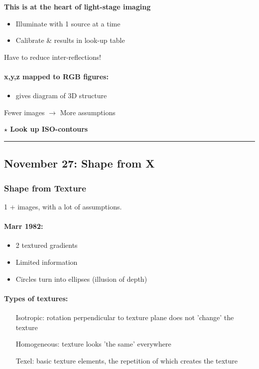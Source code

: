 \documentclass[paper=a4, fontsize=11pt]{article} %
\numberwithin{equation}{section} %
\numberwithin{figure}{section} %
\numberwithin{table}{section} %
\begin{document}
\textbf{This is at the heart of light-stage imaging}

\begin{itemize}
\item Illuminate with 1 source at a time
\item Calibrate \& results in look-up table
\end{itemize}

Have to reduce inter-reflections!

\paragraph{x,y,z mapped to RGB figures: }
\begin{itemize}
\item gives diagram of 3D structure
\end{itemize}

Fewer images $\rightarrow$ More assumptions

\textbf{$\star$ Look up ISO-contours}

\rule{\textwidth}{1pt}

\subsection{November 27: Shape from X}

\subsubsection{Shape from Texture}

1 + images, with a lot of assumptions.

\paragraph{Marr 1982:}
\begin{itemize}
\item 2 textured gradients
\item Limited information
\item Circles turn into ellipses (illusion of depth)
\end{itemize}

\paragraph{Types of textures:}
\begin{itemize}

\item[Isotropic:] rotation perpendicular to texture plane does not 'change' the texture
\item[Homogeneous:] texture looks 'the same' everywhere
\item[Texel:] basic texture elements, the repetition of which creates the texture
\end{itemize}
\end{document}
